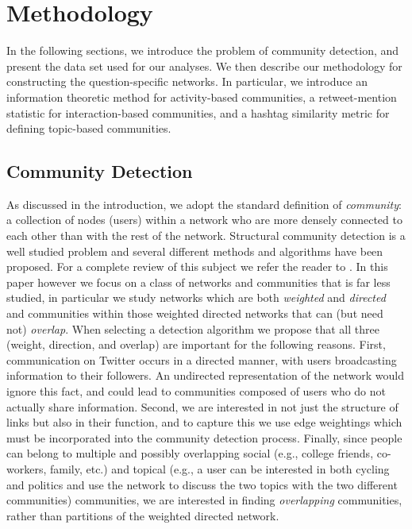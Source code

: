 \section{Methodology}

In the following sections, we introduce the problem of community detection, and present the data set used for our analyses. We then describe our methodology for constructing the question-specific networks. In particular, we introduce an information theoretic method for activity-based communities, a retweet-mention statistic for interaction-based communities, and a hashtag similarity metric for defining topic-based communities.

\subsection{Community Detection}

As discussed in the introduction, we adopt the standard definition of \emph{community}: a collection of nodes (users) within a network who are more densely connected to each other than with the rest of the network. Structural community detection is a well studied problem and several different methods and algorithms have been proposed. For a complete review of this subject we refer the reader to \cite{porter2009communities, fortunato2010community}. In this paper however we focus on a class of networks and communities that is far less studied, in particular we study networks which are both \textit{weighted} and \textit{directed} and communities within those weighted directed networks that can (but need not) \emph{overlap}. When selecting a detection algorithm we propose that all three (weight, direction, and overlap) are important for the following reasons. First, communication on Twitter occurs in a directed manner, with users broadcasting information to their followers. An undirected representation of the network would ignore this fact, and could lead to communities composed of users who do not actually share information. Second, we are interested in not just the structure of links but also in their function, and to capture this we use edge weightings which must be incorporated into the community detection process. Finally, since people can belong to multiple and possibly overlapping social (e.g., college friends, co-workers, family, etc.) and topical (e.g., a user can be interested in both cycling and politics and use the network to discuss the two topics with the two different communities) communities, we are interested in finding \textit{overlapping} communities, rather than partitions of the weighted directed network. 

